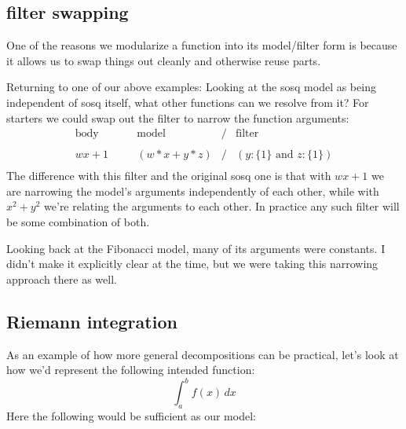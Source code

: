 \documentclass[twoside]{article}
\begin{document}
\subsection*{filter swapping}

One of the reasons we modularize a function into its model/filter form is because it allows us to swap things
out cleanly and otherwise reuse parts.

Returning to one of our above examples: Looking at the sosq model as being independent of sosq itself, what other
functions can we resolve from it? For starters we could swap out the filter to narrow the function arguments:
$$ \begin{array}{lcrcl}
\mbox{body}	& \quad & \mbox{model}	& / & \mbox{filter}			\\
										\\
wx+1		& \quad & (w*x+y*z)	& / & (y:\{1\}\mbox{ and } z:\{1\})	\\
\end{array} $$
The difference with this filter and the original sosq one is that with $ wx+1 $ we are narrowing the model's
arguments independently of each other, while with $ x^2+y^2 $ we're relating the arguments to each other.
In practice any such filter will be some combination of both.

Looking back at the Fibonacci model, many of its arguments were constants. I didn't make it explicitly clear
at the time, but we were taking this narrowing approach there as well.

\subsection*{Riemann integration}

As an example of how more general decompositions can be practical, let's look at how we'd represent the following
intended function:
$$ \int_a^bf(x)\,dx $$
Here the following would be sufficient as our model:
\end{document}
